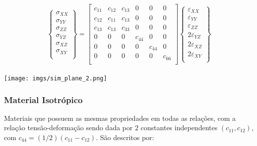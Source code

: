 \documentclass{article}
\begin{document}
\begin{minipage}{.5\textwidth}
    \begin{align*}
        \begin{Bmatrix}
            \sigma_{XX} \\
            \sigma_{YY} \\
            \sigma_{ZZ} \\
            \sigma_{YZ} \\
            \sigma_{XZ} \\
            \sigma_{XY} \\
        \end{Bmatrix} =
        \begin{bmatrix}
            c_{11} & c_{12} & c_{13} & 0      & 0      & 0      \\
            c_{12} & c_{11} & c_{13} & 0      & 0      & 0      \\
            c_{13} & c_{13} & c_{33} & 0      & 0      & 0      \\
            0      & 0      & 0      & c_{44} & 0      & 0      \\
            0      & 0      & 0      & 0      & c_{44} & 0      \\
            0      & 0      & 0      & 0      & 0      & c_{66} \\
        \end{bmatrix}
        \begin{Bmatrix}
            \varepsilon_{XX}  \\
            \varepsilon_{YY}  \\
            \varepsilon_{ZZ}  \\
            2\varepsilon_{YZ} \\
            2\varepsilon_{XZ} \\
            2\varepsilon_{XY} \\
        \end{Bmatrix}
    \end{align*}
\end{minipage}
\begin{minipage}{.5\textwidth}
    \centering
    \texttt{[image: imgs/sim\_plane\_2.png]}
\end{minipage}

\subsubsection*{Material Isotrópico}
Materiais que possuem as mesmas propriedades em todas as relações, com a relação tensão-deformação sendo dada por $2$ constantes independentes $(c_{11}, c_{12})$, com $c_{44} = (1/2)(c_{11} - c_{12})$. São descritos por:
\end{document}
